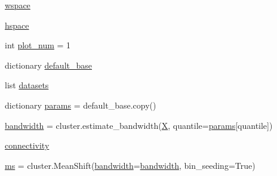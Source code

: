 \begin{DoxyCompactItemize}
\item 
\hyperlink{namespaceStreamClusteringAlgorithms_1_1evoStream_1_1v1_1_1Tests_1_1plot__cluster__comparison2_a4d3f68526ae0aca4d78820f68afd18d9}{wspace}
\item 
\hyperlink{namespaceStreamClusteringAlgorithms_1_1evoStream_1_1v1_1_1Tests_1_1plot__cluster__comparison2_ae7b279407a28540d18da2af5f1142557}{hspace}
\item 
int \hyperlink{namespaceStreamClusteringAlgorithms_1_1evoStream_1_1v1_1_1Tests_1_1plot__cluster__comparison2_a9f649c30a2bbb78e8464d750eec2ae9f}{plot\+\_\+num} = 1
\item 
dictionary \hyperlink{namespaceStreamClusteringAlgorithms_1_1evoStream_1_1v1_1_1Tests_1_1plot__cluster__comparison2_aaf17a1f40efa678a5a6e402c49faabff}{default\+\_\+base}
\item 
list \hyperlink{namespaceStreamClusteringAlgorithms_1_1evoStream_1_1v1_1_1Tests_1_1plot__cluster__comparison2_a90aa32a684790308f42a927fea4d2e94}{datasets}
\item 
dictionary \hyperlink{namespaceStreamClusteringAlgorithms_1_1evoStream_1_1v1_1_1Tests_1_1plot__cluster__comparison2_a1449d875d082f7c913611e6412520189}{params} = default\+\_\+base.\+copy()
\item 
\hyperlink{namespaceStreamClusteringAlgorithms_1_1evoStream_1_1v1_1_1Tests_1_1plot__cluster__comparison2_adb18e1821a9794c4665c91e3dc7c3d1f}{bandwidth} = cluster.\+estimate\+\_\+bandwidth(\hyperlink{namespaceStreamClusteringAlgorithms_1_1evoStream_1_1v1_1_1Tests_1_1plot__cluster__comparison2_a42d5c34407175950c07cb7d0b2156182}{X}, quantile=\hyperlink{namespaceStreamClusteringAlgorithms_1_1evoStream_1_1v1_1_1Tests_1_1plot__cluster__comparison2_a1449d875d082f7c913611e6412520189}{params}\mbox{[}\textquotesingle{}quantile\textquotesingle{}\mbox{]})
\item 
\hyperlink{namespaceStreamClusteringAlgorithms_1_1evoStream_1_1v1_1_1Tests_1_1plot__cluster__comparison2_a7076f81562105676ec44f1be11156ce0}{connectivity}
\item 
\hyperlink{namespaceStreamClusteringAlgorithms_1_1evoStream_1_1v1_1_1Tests_1_1plot__cluster__comparison2_aa9d8ef3552ccc66b8e08f9a6e430b663}{ms} = cluster.\+Mean\+Shift(\hyperlink{namespaceStreamClusteringAlgorithms_1_1evoStream_1_1v1_1_1Tests_1_1plot__cluster__comparison2_adb18e1821a9794c4665c91e3dc7c3d1f}{bandwidth}=\hyperlink{namespaceStreamClusteringAlgorithms_1_1evoStream_1_1v1_1_1Tests_1_1plot__cluster__comparison2_adb18e1821a9794c4665c91e3dc7c3d1f}{bandwidth}, bin\+\_\+seeding=True)
\item 

\end{DoxyCompactItemize}
